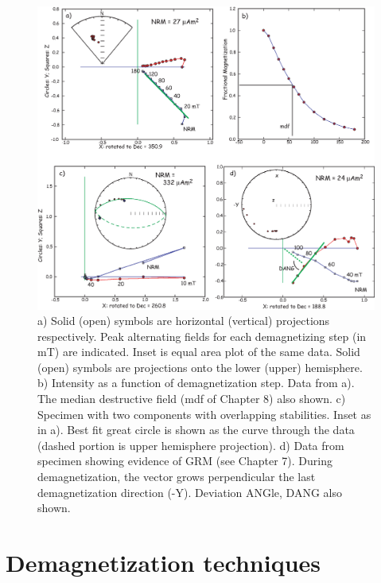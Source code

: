 \begin{figure}[htb]
\centering  \includegraphics[width=14 cm]{EPSfiles/zijd.eps}
\caption{a) Solid (open) symbols are horizontal (vertical) projections respectively.  
 Peak alternating fields for each demagnetizing step (in mT) are indicated.  
  Inset is equal area plot of the same data.   Solid (open) symbols are projections onto the lower (upper)
hemisphere.  b) Intensity  as a function of demagnetization step.  Data from a).   
The median destructive field (mdf of Chapter 8) also shown.  c)  Specimen with  two components with overlapping stabilities.  Inset  as in a).   Best fit great circle is shown as the curve through the data (dashed portion is upper hemisphere projection). d) Data from specimen showing evidence of GRM (see Chapter 7).  During  demagnetization, the vector grows perpendicular the last demagnetization direction (-Y).  Deviation ANGle, DANG also shown.  }
\label{fig:zijd}
\end{figure}\nocite{tauxe03b} \nocite{tauxe04b} 

\clearpage


\section {Demagnetization techniques}
\label{sect:demag}


